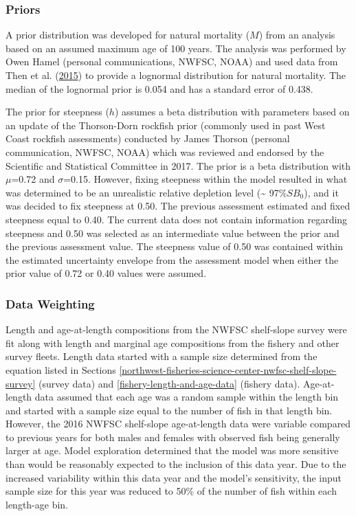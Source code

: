 \documentclass[12pt,]{article}
\begin{document}
\subsubsection{Priors}\label{priors}

A prior distribution was developed for natural mortality (\(M\)) from an
analysis based on an assumed maximum age of 100 years. The analysis was
performed by Owen Hamel (personal communications, NWFSC, NOAA) and used
data from Then et al.
(\protect\hyperlink{ref-then_evaluating_2015}{2015}) to provide a
lognormal distribution for natural mortality. The median of the
lognormal prior is 0.054 and has a standard error of 0.438.

The prior for steepness (\(h\)) assumes a beta distribution with
parameters based on an update of the Thorson-Dorn rockfish prior
(commonly used in past West Coast rockfish assessments) conducted by
James Thorson (personal communication, NWFSC, NOAA) which was reviewed
and endorsed by the Scientific and Statistical Committee in 2017. The
prior is a beta distribution with \(\mu\)=0.72 and \(\sigma\)=0.15.
However, fixing steepness within the model resulted in what was
determined to be an unrealistic relative depletion level
(\textasciitilde{} 97\%\(SB_0\)), and it was decided to fix steepness at
0.50. The previous assessment estimated and fixed steepness equal to
0.40. The current data does not contain information regarding steepness
and 0.50 was selected as an intermediate value between the prior and the
previous assessment value. The steepness value of 0.50 was contained
within the estimated uncertainty envelope from the assessment model when
either the prior value of 0.72 or 0.40 values were assumed.

\subsubsection{Data Weighting}\label{data-weighting}

Length and age-at-length compositions from the NWFSC shelf-slope survey
were fit along with length and marginal age compositions from the
fishery and other survey fleets. Length data started with a sample size
determined from the equation listed in Sections
\ref{northwest-fisheries-science-center-nwfsc-shelf-slope-survey}
(survey data) and \ref{fishery-length-and-age-data} (fishery data).
Age-at-length data assumed that each age was a random sample within the
length bin and started with a sample size equal to the number of fish in
that length bin. However, the 2016 NWFSC shelf-slope age-at-length data
were variable compared to previous years for both males and females with
observed fish being generally larger at age. Model exploration
determined that the model was more sensitive than would be reasonably
expected to the inclusion of this data year. Due to the increased
variability within this data year and the model's sensitivity, the input
sample size for this year was reduced to 50\% of the number of fish
within each length-age bin.
\end{document}
